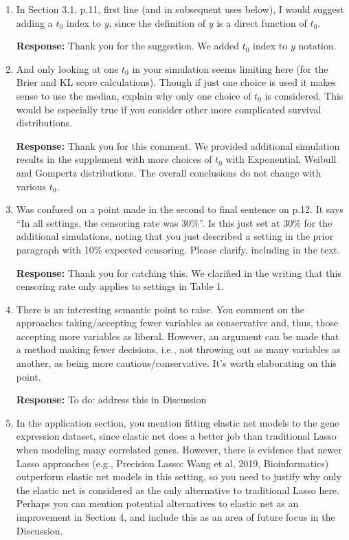 \documentclass[12]{article}
\newcommand{\re}{\textbf{Response: }}
\newcommand\bd[1]{{\color{blue}#1}}
\begin{document}
\begin{enumerate}[align = left]
\re Thank you for the suggestion. We added the sentence to the first paragraph of Section 3.1.

\item In Section 3.1, p.11, first line (and in subsequent uses below), I would suggest adding a $t_0$ index to $y$, since the definition of $y$ is a direct function of $t_0$.

\re Thank you for the suggestion. We added $t_0$ index to $y$ notation.

\item And only looking at one $t_0$ in your simulation seems limiting here (for the Brier and KL score calculations). Though if just one choice is used it makes sense to use the median, explain why only one choice of $t_0$ is considered.  This would be especially true if you consider other more complicated survival distributions.

\re Thank you for this comment. We provided additional simulation results in the supplement with more choices of $t_0$ with Exponential, Weibull and Gompertz distributions. The overall conclusions do not change with various $t_0$.

\item Was confused on a point made in the second to final sentence on p.12. It says “In all settings, the censoring rate was 30$\%$”. Is this just set at 30$\%$ for the additional simulations, noting that you just described a setting in the prior paragraph with 10$\%$ expected censoring. Please clarify, including in the text. 

\re Thank you for catching this. We clarified in the writing that this censoring rate only applies to settings in Table 1.

\item There is an interesting semantic point to raise. You comment on the approaches taking/accepting fewer variables as conservative and, thus, those accepting more variables as liberal. However, an argument can be made that a method making fewer decisions, i.e., not throwing out as many variables as another, as being more cautious/conservative. It’s worth elaborating on this point.

\re \bd{To do: address this in Discussion}

\item In the application section, you mention fitting elastic net models to the gene expression dataset, since elastic net does a better job than traditional Lasso when modeling many correlated genes. However, there is evidence that newer Lasso approaches (e.g., Precision Lasso: Wang et al, 2019, Bioinformatics) outperform elastic net models in this setting, so you need to justify why only the elastic net is considered as the only alternative to traditional Lasso here. Perhaps you can mention potential alternatives to elastic net as an improvement in Section 4, and include this as an area of future focus in the Discussion.


\end{enumerate}
\end{document}
